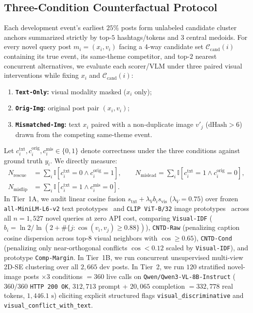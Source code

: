 \subsection{Three-Condition Counterfactual Protocol}
\label{sec:paired_protocol}

Each development event's earliest $25\%$ posts form unlabeled candidate cluster anchors summarized strictly by top-$5$ hashtags/tokens and $3$ central medoids. For every novel query post $m_i = (x_i, v_i)$ facing a 4-way candidate set $\mathcal{C}_{\text{cand}}(i)$ containing its true event, its same-theme competitor, and top-$2$ nearest concurrent alternatives, we evaluate each scorer/VLM under three paired visual interventions while fixing $x_i$ and $\mathcal{C}_{\text{cand}}(i)$:
\begin{enumerate}
    \item \textbf{\texttt{Text-Only}:} visual modality masked ($x_i$ only);
    \item \textbf{\texttt{Orig-Img}:} original post pair $(x_i, v_i)$;
    \item \textbf{\texttt{Mismatched-Img}:} text $x_i$ paired with a non-duplicate image $v'_j$ ($\mathrm{dHash} > 6$) drawn from the competing same-theme event.
\end{enumerate}
Let $c^{\text{txt}}_i, c^{\text{orig}}_i, c^{\text{mis}}_i \in \{0,1\}$ denote correctness under the three conditions against ground truth $y_i$. We directly measure:
\begin{equation}
\label{eq:rescue_mislead}
\begin{aligned}
N_{\text{rescue}} &= \sum_i \mathbb{I}[c^{\text{txt}}_i = 0 \wedge c^{\text{orig}}_i = 1], \qquad
N_{\text{mislead}} = \sum_i \mathbb{I}[c^{\text{txt}}_i = 1 \wedge c^{\text{orig}}_i = 0], \\
N_{\text{misflip}} &= \sum_i \mathbb{I}[c^{\text{txt}}_i = 1 \wedge c^{\text{mis}}_i = 0].
\end{aligned}
\end{equation}
In Tier~1A, we audit linear cosine fusion $s_{\text{txt}} + \lambda_V b_i s_{\text{vis}}$ ($\lambda_V = 0.75$) over frozen \texttt{all-MiniLM-L6-v2} text prototypes~\cite{reimers2019sentence} and \texttt{CLIP ViT-B/32} image prototypes~\cite{radford2021clip} across all $n=1{,}527$ novel queries at zero API cost, comparing \texttt{Visual-IDF} ($b_i = \ln 2 / \ln(2 + \#\{j : \cos(v_i, v_j) \ge 0.88\})$), \texttt{CNTD-Raw} (penalizing caption cosine dispersion across top-8 visual neighbors with $\cos \ge 0.65$), \texttt{CNTD-Cond} (penalizing only near-orthogonal conflicts $\cos < 0.12$ scaled by \texttt{Visual-IDF}), and prototype \texttt{Comp-Margin}. In Tier~1B, we run concurrent unsupervised multi-view 2D-SE clustering over all $2{,}665$ dev posts. In Tier~2, we run $120$ stratified novel-image posts $\times 3$ conditions $= 360$ live calls on \texttt{Qwen/Qwen3-VL-8B-Instruct} ($360/360$ \texttt{HTTP 200 OK}, $312{,}713$ prompt + $20{,}065$ completion $= 332{,}778$ real tokens, $1{,}446.1\text{ s}$) eliciting explicit structured flags \texttt{visual\_discriminative} and \texttt{visual\_conflict\_with\_text}.

